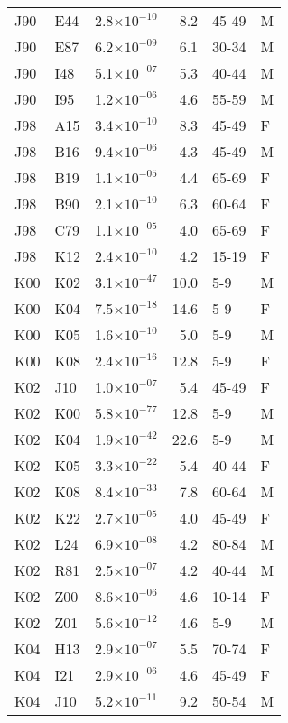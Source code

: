 \begin{longtable}{lllrll}
   J90 & E44 & 2.8$\times10^{-10}$ & 8.2 & 45-49 & M \\ 
   J90 & E87 & 6.2$\times10^{-09}$ & 6.1 & 30-34 & M \\ 
   J90 & I48 & 5.1$\times10^{-07}$ & 5.3 & 40-44 & M \\ 
   J90 & I95 & 1.2$\times10^{-06}$ & 4.6 & 55-59 & M \\ 
   J98 & A15 & 3.4$\times10^{-10}$ & 8.3 & 45-49 & F \\ 
   J98 & B16 & 9.4$\times10^{-06}$ & 4.3 & 45-49 & M \\ 
   J98 & B19 & 1.1$\times10^{-05}$ & 4.4 & 65-69 & F \\ 
   J98 & B90 & 2.1$\times10^{-10}$ & 6.3 & 60-64 & F \\ 
   J98 & C79 & 1.1$\times10^{-05}$ & 4.0 & 65-69 & F \\ 
   J98 & K12 & 2.4$\times10^{-10}$ & 4.2 & 15-19 & F \\ 
   K00 & K02 & 3.1$\times10^{-47}$ & 10.0 & 5-9 & M \\ 
   K00 & K04 & 7.5$\times10^{-18}$ & 14.6 & 5-9 & F \\ 
   K00 & K05 & 1.6$\times10^{-10}$ & 5.0 & 5-9 & M \\ 
   K00 & K08 & 2.4$\times10^{-16}$ & 12.8 & 5-9 & F \\ 
   K02 & J10 & 1.0$\times10^{-07}$ & 5.4 & 45-49 & F \\ 
   K02 & K00 & 5.8$\times10^{-77}$ & 12.8 & 5-9 & M \\ 
   K02 & K04 & 1.9$\times10^{-42}$ & 22.6 & 5-9 & M \\ 
   K02 & K05 & 3.3$\times10^{-22}$ & 5.4 & 40-44 & F \\ 
   K02 & K08 & 8.4$\times10^{-33}$ & 7.8 & 60-64 & M \\ 
   K02 & K22 & 2.7$\times10^{-05}$ & 4.0 & 45-49 & F \\ 
   K02 & L24 & 6.9$\times10^{-08}$ & 4.2 & 80-84 & M \\ 
   K02 & R81 & 2.5$\times10^{-07}$ & 4.2 & 40-44 & M \\ 
   K02 & Z00 & 8.6$\times10^{-06}$ & 4.6 & 10-14 & F \\ 
   K02 & Z01 & 5.6$\times10^{-12}$ & 4.6 & 5-9 & M \\ 
   K04 & H13 & 2.9$\times10^{-07}$ & 5.5 & 70-74 & F \\ 
   K04 & I21 & 2.9$\times10^{-06}$ & 4.6 & 45-49 & F \\ 
   K04 & J10 & 5.2$\times10^{-11}$ & 9.2 & 50-54 & M \\ 

\end{longtable}
